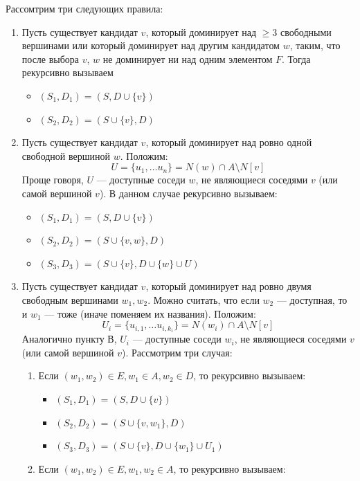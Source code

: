 Рассомтрим три следующих правила:
\begin{enumerate}[label=\Alph*]
    \item Пусть существует кандидат \(v\), который доминирует над \(\ge 3\) свободными вершинами или который доминирует над другим кандидатом \(w\), таким, что после выбора \(v\), \(w\) не доминирует ни над одним элементом \(F\). Тогда рекурсивно вызываем
    \begin{itemize}
        \item \((S_1, D_1) = (S, D \cup \{v\})\)
        \item \((S_2, D_2) = (S \cup \{v\}, D)\)
    \end{itemize}
    \item Пусть существует кандидат \(v\), который доминирует над ровно одной свободной вершиной \(w\). Положим:
    \[U = \{u_1, \dots u_n\} = N(w) \cap A \setminus N[v]\]
    Проще говоря, \(U\) --- доступные соседи \(w\), не являющиеся соседями \(v\) (или самой вершиной \(v\)). В данном случае рекурсивно вызываем:
    \begin{itemize}
        \item \((S_1, D_1) = (S, D \cup \{v\})\)
        \item \((S_2, D_2) = (S \cup \{v, w\}, D)\)
        \item \((S_3, D_3) = (S \cup \{v\}, D \cup \{w\} \cup U)\)
    \end{itemize}
    \item Пусть существует кандидат \(v\), который доминирует над ровно двумя свободным вершинами \(w_1, w_2\). Можно считать, что если \(w_2\) --- доступная, то и \(w_1\) --- тоже (иначе поменяем их названия). Положим:
    \[U_i = \{u_{i, 1}, \dots u_{i, k_i}\} = N(w_i) \cap A \setminus N[v]\]
    Аналогично пункту В, \(U_i\) --- доступные соседи \(w_i\), не являющиеся соседями \(v\) (или самой вершиной \(v\)). Рассмотрим три случая:
    \begin{enumerate}
        \item Если \((w_1, w_2) \in E, w_1 \in A, w_2 \in D\), то рекурсивно вызываем:
        \begin{itemize}
            \item \((S_1, D_1) = (S, D \cup \{v\})\)
            \item \((S_2, D_2) = (S \cup \{v, w_1\}, D)\)
            \item \((S_3, D_3) = (S \cup \{v\}, D \cup \{w_1\} \cup U_1)\)
        \end{itemize}
        \item Если \((w_1, w_2) \in E, w_1, w_2 \in A\), то рекурсивно вызываем:

\end{enumerate}
\end{enumerate}
